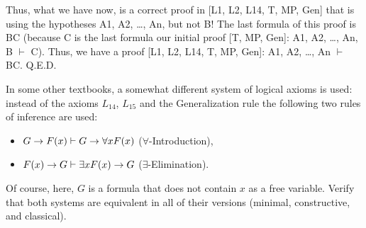 Thus, what we have now, is a correct proof in [L1, L2, L14, T, MP, Gen] that is using the hypotheses A1,
A2, \ldots , An, but not B! The last formula of this proof is B\IMPLIES C (because C is the last formula our initial
proof [T, MP, Gen]: A1, A2, \ldots , An, B \(\vdash\) C). Thus, we have a proof [L1, L2, L14, T, MP, Gen]: A1, A2, \ldots ,
An \(\vdash\) B\IMPLIES C. Q.E.D.

\begin{exercise}
In some other textbooks, a somewhat different system of logical axioms is used: instead of the axioms \(L_{14}\), \(L_{15}\) and the Generalization rule the following two rules of inference are used:
\begin{itemize}
    \item \(G\rightarrow F(x) \vdash G\rightarrow \forall xF(x)\) (\(\forall\)-Introduction),
    \item \(F(x)\rightarrow G \vdash \exists xF(x)\rightarrow G\) (\(\exists\)-Elimination).
\end{itemize}
Of course, here, \(G\) is a formula that does not contain \(x\) as a free variable. Verify that both systems are
equivalent in all of their versions (minimal, constructive, and classical).
\end{exercise}
